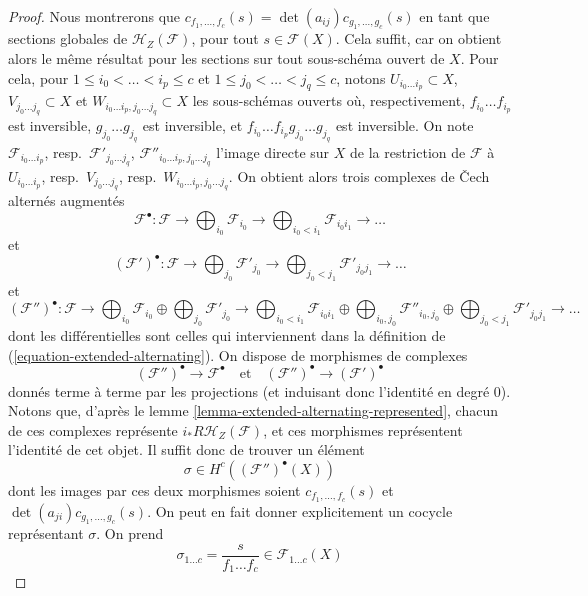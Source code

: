 \begin{proof}
Nous montrerons que $c_{f_1, \ldots, f_c}(s) =
\det(a_{ij}) c_{g_1, \ldots, g_c}(s)$ en tant que sections globales de
$\mathcal{H}_Z(\mathcal{F})$, pour tout $s \in \mathcal{F}(X)$.
Cela suffit, car on obtient alors le même résultat pour les
sections sur tout sous-schéma ouvert de $X$.
Pour cela, pour $1 \leq i_0 < \ldots < i_p \leq c$
et $1 \leq j_0 < \ldots < j_q \leq c$, notons
$U_{i_0 \ldots i_p} \subset X$,
$V_{j_0 \ldots j_q} \subset X$ et
$W_{i_0 \ldots i_p, j_0 \ldots j_q} \subset X$
les sous-schémas ouverts où, respectivement, $f_{i_0} \ldots f_{i_p}$ est inversible,
$g_{j_0} \ldots g_{j_q}$ est inversible, et
$f_{i_0} \ldots f_{i_p}g_{j_0} \ldots g_{j_q}$ est inversible.
On note $\mathcal{F}_{i_0 \ldots i_p}$,
resp.\ $\mathcal{F}'_{j_0 \ldots j_q}$,
$\mathcal{F}''_{i_0 \ldots i_p, j_0 \ldots j_q}$
l'image directe sur $X$ de la restriction de $\mathcal{F}$ à
$U_{i_0 \ldots i_p}$, resp.\ $V_{j_0 \ldots j_q}$,
resp.\ $W_{i_0 \ldots i_p, j_0 \ldots j_q}$.
On obtient alors trois complexes de {\v C}ech alternés augmentés
$$
\mathcal{F}^\bullet :
\mathcal{F} \to \bigoplus\nolimits_{i_0} \mathcal{F}_{i_0} \to
\bigoplus\nolimits_{i_0 < i_1} \mathcal{F}_{i_0i_1} \to \ldots
$$
et
$$
(\mathcal{F}')^\bullet :
\mathcal{F} \to \bigoplus\nolimits_{j_0} \mathcal{F}'_{j_0} \to
\bigoplus\nolimits_{j_0 < j_1} \mathcal{F}'_{j_0j_1} \to \ldots
$$
et
$$
(\mathcal{F}'')^\bullet :
\mathcal{F} \to
\bigoplus\nolimits_{i_0} \mathcal{F}_{i_0} \oplus
\bigoplus\nolimits_{j_0} \mathcal{F}'_{j_0} \to
\bigoplus\nolimits_{i_0 < i_1} \mathcal{F}_{i_0i_1} \oplus
\bigoplus\nolimits_{i_0, j_0} \mathcal{F}''_{i_0, j_0} \oplus
\bigoplus\nolimits_{j_0 < j_1} \mathcal{F}'_{j_0j_1} \to
\ldots
$$
dont les différentielles sont celles qui interviennent dans la définition de
(\ref{equation-extended-alternating}).
On dispose de morphismes de complexes
$$
(\mathcal{F}'')^\bullet \to \mathcal{F}^\bullet
\quad\text{et}\quad
(\mathcal{F}'')^\bullet \to (\mathcal{F}')^\bullet
$$
donnés terme à terme par les projections (et induisant donc
l'identité en degré $0$). Notons que, d'après
le lemme \ref{lemma-extended-alternating-represented},
chacun de ces complexes représente
$i_*R\mathcal{H}_Z(\mathcal{F})$, et ces morphismes
représentent l'identité de cet objet. Il suffit donc
de trouver un élément
$$
\sigma \in H^c((\mathcal{F}'')^\bullet(X))
$$
dont les images par ces deux morphismes soient $c_{f_1, \ldots, f_c}(s)$ et $\det(a_{ji})c_{g_1, \ldots, g_c}(s)$.
On peut en fait donner explicitement un cocycle
représentant $\sigma$. On prend
$$
\sigma_{1 \ldots c} = \frac{s}{f_1 \ldots f_c} \in \mathcal{F}_{1 \ldots c}(X)
$$
\end{proof}
